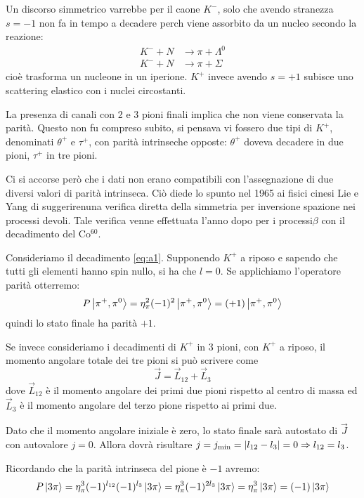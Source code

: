 Un discorso simmetrico varrebbe per il caone $K^-$, solo che avendo stranezza $s
= -1$ non fa in tempo a decadere perch viene assorbito da un nucleo secondo la
reazione:
\begin{align*}
  K^- + N &\rightarrow \pi + \Lambda^0\\
  K^- + N &\rightarrow \pi + \Sigma
\end{align*}
cioè trasforma un nucleone in un iperione. $K^+$ invece avendo $s=+1$ subisce
uno scattering elastico con i nuclei circostanti.

La presenza di canali con 2 e 3 pioni finali implica che non viene conservata la
parità. Questo non fu compreso subito, si pensava vi fossero due tipi di $K^+$,
denominati $\theta^+$ e $\tau^+$, con parità intrinseche opposte: $\theta^+$
doveva decadere in due pioni, $\tau^+$ in tre pioni.

Ci si accorse però che i dati non erano compatibili con l'assegnazione di due
diversi valori di parità intrinseca. Ciò diede lo spunto nel 1965 ai fisici
cinesi Lie e Yang di suggerirenuna verifica diretta della simmetria per
inversione spazione nei processi devoli. Tale verifica venne effettuata l'anno
dopo per i processi$\beta$ con il decadimento del Co$^{60}$.

Consideriamo il decadimento \eqref{eq:a1}. Supponendo $K^+$ a riposo e sapendo
che tutti gli elementi hanno spin nullo, si ha che $l =0$. Se applichiamo
l'operatore parità otterremo:
\begin{equation}
  P\Ket{\pi^+,\pi^0} = \eta_\pi^2(-1)^2\Ket{\pi^+,\pi^0}=(+1)\Ket{\pi^+,\pi^0}
\end{equation}
quindi lo stato finale ha parità $+1$.

Se invece consideriamo i decadimenti di $K^+$ in 3 pioni, con $K^+$ a riposo, il
momento angolare totale dei tre pioni si può scrivere come
\[
  \vec{J} = \vec{L}_{12} + \vec{L}_3
\]
dove $\vec{L}_{12}$ è il momento angolare dei primi due pioni rispetto al centro
di massa ed $\vec{L}_3$ è il momento angolare del terzo pione rispetto ai primi
due.

Dato che il momento angolare iniziale è zero, lo stato finale sarà autostato di
$\vec{J}$ con autovalore $j =0$. Allora dovrà risultare $j = j_{\text{min}} =
\left| l_{12}-l_3 \right| =0\Rightarrow l_{12} = l_3$.

Ricordando che la parità intrinseca del pione è $-1$ avremo:
\[
  P\Ket{3\pi} = \eta^3_\pi(-1)^{l_{12}}(-1)^{l_3}\Ket{3\pi} =
  \eta^3_\pi(-1)^{2l_3}\Ket{3\pi} = \eta^3_\pi\Ket{3\pi} = (-1)\Ket{3\pi}
\]


